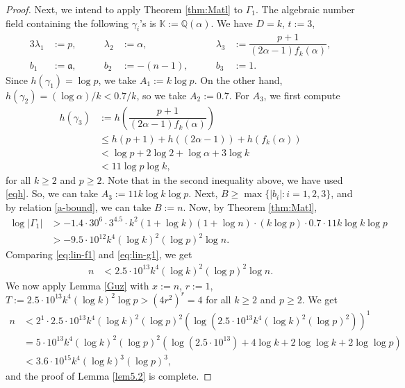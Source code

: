 \documentclass[11pt,a4paper]{article}
\numberwithin{equation}{section}
\numberwithin{table}{section}
\numberwithin{figure}{section}
\begin{document}
\begin{proof}
Next, we intend to apply Theorem \ref{thm:Matl} to $\Gamma_1$. The algebraic number field containing the following $\gamma_i$'s is $\mathbb{K} := \mathbb{Q}(\alpha)$. We have $D = k$, $t := 3$,
\begin{alignat*}{3}
	\lambda_{1} &:= p,         &\qquad \lambda_{2} &:= \alpha,         &\qquad \lambda_{3} &:= \dfrac{p+1}{(2\alpha-1)f_k(\alpha)},      \\
	b_1         &:= \mathfrak{a},        &\qquad b_2    &:= -(n-1),         &\qquad b_3    &:= 1.
\end{alignat*}
Since $h(\gamma_{1})= \log p$, we take $A_1:=k \log p$. On the other hand, $h(\gamma_{2}) =(\log \alpha)/k <0.7/k$, so we take $A_{2}:=0.7$.
For $A_3$, we first compute 
\begin{align*}
	h(\gamma_{3})&:=h\left(\dfrac{p+1}{(2\alpha-1)f_k(\alpha)}\right)\\
	&\le h(p+1)+ h\left((2\alpha-1)\right)+h\left(f_k(\alpha)\right)\\
	&< \log p +2\log 2+\log \alpha+3\log k\\
	&<11\log p\log k,
\end{align*}
for all $k\ge 2$ and $p\ge 2$. Note that in the second inequality above, we have used \eqref{eqh}. So, we can take $A_3:=11k\log k\log p$. Next, $B \geq \max\{|b_i|:i=1,2,3\}$, and by relation \eqref{a-bound}, we can take $B:=n$. Now, by Theorem \ref{thm:Matl},
\begin{align}\label{eq:lin-g1}
	\log |\Gamma_1| &> -1.4\cdot 30^{6} \cdot 3^{4.5}\cdot k^2 (1+\log k)(1+\log n)\cdot (k\log p)\cdot 0.7\cdot 11k\log k\log p\nonumber\\
	&> - 9.5\cdot 10^{12}k^4 (\log k)^2(\log p)^2\log n.
\end{align}
Comparing \eqref{eq:lin-f1} and \eqref{eq:lin-g1}, we get
\begin{align*}
	n&<2.5\cdot 10^{13}k^4 (\log k)^2(\log p)^2\log n.
\end{align*}
We now apply Lemma \ref{Guz} with  $x:=n$, $r:=1$, $T:=2.5\cdot 10^{13}k^4 (\log k)^2\log p >(4r^2)^r=4$ for all $k\ge 2$ and $p\ge 2$. We get 
\begin{align*}
	n&<2^1\cdot 2.5\cdot 10^{13}k^4 (\log k)^2(\log p)^2\left(\log (2.5\cdot 10^{13}k^4 (\log k)^2(\log p)^2)\right)^1\\
	&=5\cdot 10^{13} k^{4}(\log k)^2 (\log p)^2\left(\log (2.5\cdot 10^{13})+4\log k+2\log\log k+2\log \log p\right)\\
	&<3.6\cdot 10^{15} k^{4}(\log k)^3 (\log p)^3  ,
 \end{align*}
and the proof of Lemma \ref{lem5.2} is complete.		
\end{proof}
\end{document}
